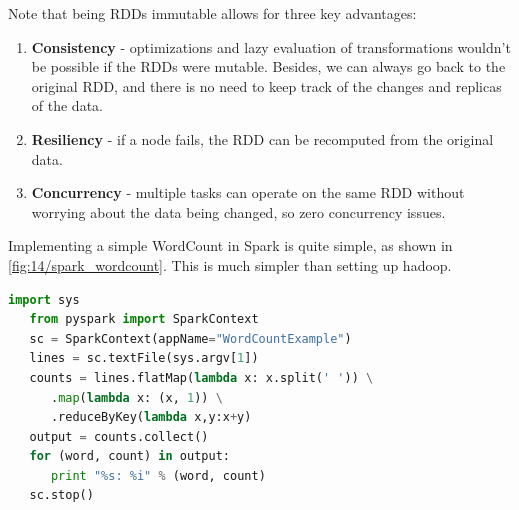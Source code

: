 Note that being RDDs immutable allows for three key advantages:
\begin{enumerate}
   \item \textbf{Consistency} - optimizations and lazy evaluation of transformations wouldn't be possible if the RDDs were mutable. 
   Besides, we can always go back to the original RDD, and there is no need to keep track of the changes and replicas of the data.
   \item \textbf{Resiliency} - if a node fails, the RDD can be recomputed from the original data.
   \item \textbf{Concurrency} - multiple tasks can operate on the same RDD without worrying about the data being changed, so zero concurrency issues.
\end{enumerate}


Implementing a simple WordCount in Spark is quite simple, as shown in \autoref{fig:14/spark_wordcount}.
This is much simpler than setting up hadoop.
\begin{lstlisting}[language=Python, caption={Spark WordCount example}]
   import sys
   from pyspark import SparkContext
   sc = SparkContext(appName="WordCountExample")
   lines = sc.textFile(sys.argv[1])
   counts = lines.flatMap(lambda x: x.split(' ')) \
      .map(lambda x: (x, 1)) \
      .reduceByKey(lambda x,y:x+y)
   output = counts.collect()
   for (word, count) in output:
      print "%s: %i" % (word, count)
   sc.stop()
\end{lstlisting}
